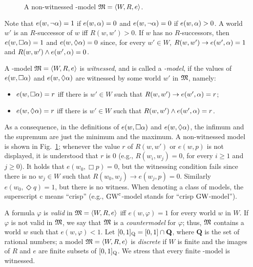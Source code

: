 \begin{figure}[t]
  \centering
  
  \caption{A non-witnessed \GM-model $\mathfrak{M}=\langle W,R,e \rangle$.}  
  \label{fig:nonWitn}
\end{figure}


\noindent
Note that $e(w,\neg\alpha)=1$ if $e(w,\alpha)=0$ and $e(w,\neg\alpha)=0$ if
$e(w,\alpha)>0$.  A world $w'$ is an $R$-successor of $w$ iff $R(w,
w')>0$. If $w$ has no $R$-successors, then $e(w,\Box\alpha)=1$ and
$e(w,\lozenge\alpha)=0$ since, for every $w'\in W$, $R(w,w') \to e(w',\alpha) =
1$ and $R(w,w')\land e(w',\alpha) = 0$.  



A \GM-model $\mathfrak{M}=\langle W,R,e \rangle$ is \emph{witnessed}, and is called a
\emph{\GWM-model}, if the values of $e(w,\Box\alpha)$ and $e(w,\lozenge\alpha)$
are witnessed by some world $w'$ in $\mathfrak{M}$, namely:
\begin{itemize}
\item $e(w,\Box \alpha)=r$ iff there is $w'\in W$ such that $R(w,w') \to
  e(w',\alpha) = r$;

\item $e(w,\lozenge \alpha)=r$ iff there is $w'\in W$ such that
  $R(w,w')\land e(w',\alpha) = r$.
\end{itemize}
As a consequence, in the definitions of $e(w,\Box \alpha)$ and $e(w,\lozenge
\alpha)$, the infimum and the supremum are just the minimum and the
maximum. A non-witnessed model is shown in Fig.~\ref{fig:nonWitn};
whenever the value $r$ of $R(w,w')$ or $e(w,p)$ is not displayed, it
is understood that $r$ is 0 (e.g., $R(w_i,w_j)=0$, for every $i\geq 1$
and $j\geq 0$).  It holds that $e(w_0,\Box p)=0$, but the witnessing
condition fails since there is no $w_j\in W$ such that $R(w_0,w_j) \to
e(w_j,p)=0$.  Similarly $e(w_0,\Diamond q)=1$, but there is no
witness.  When denoting a class of models, the superscript
$\mathrm{c}$ means ``crisp'' (e.g., $\mbox{$\mathrm{GW}^\mathrm{c}$}$-model stands for ``crisp
$\mbox{$\mathrm{GW}$}$-model'').

A formula $\varphi$ is \emph{valid} in $\mathfrak{M}=\langle W,R,e \rangle$ iff
$e(w,\varphi)=1$ for every world $w$ in $W$.  If $\varphi$ is not
valid in $\mathfrak{M}$, we say that $\mathfrak{M}$ is a \emph{countermodel} for
$\varphi$; thus, $\mathfrak{M}$ contains a world $w$ such that $e(w,\varphi) <
1$.  Let $[0,1]_{\mathrm{Q}}=[0,1]\cap\mathbf{Q}$, where $\mathbf{Q}$ is the set
of rational numbers; a model $\mathfrak{M}=\langle W,R,e \rangle$ is \emph{discrete} if
$W$ is finite and the images of $R$ and $e$ are finite subsets of
$[0,1]_{\mathrm{Q}}$. We stress that every finite \GM-model is witnessed.

